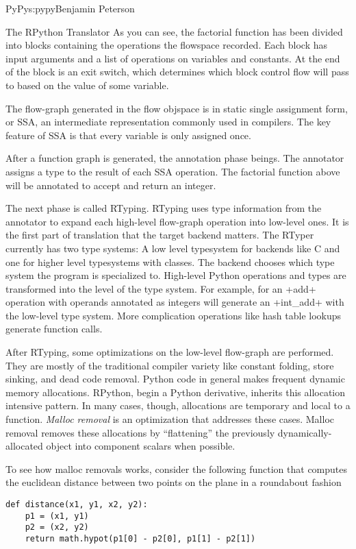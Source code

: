 \begin{aosachapter}{PyPy}{s:pypy}{Benjamin Peterson}
\begin{aosasect1}{The RPython Translator}
As you can see, the factorial function has been divided into blocks containing
the operations the flowspace recorded. Each block has input arguments and a list
of operations on variables and constants. At the end of the block is an exit
switch, which determines which block control flow will pass to based on the
value of some variable.

The flow-graph generated in the flow objspace is in static single assignment
form, or SSA, an intermediate representation commonly used in compilers. The key
feature of SSA is that every variable is only assigned once.

After a function graph is generated, the annotation phase beings. The annotator
assigns a type to the result of each SSA operation. The factorial function above
will be annotated to accept and return an integer.

The next phase is called RTyping. RTyping uses type information from the
annotator to expand each high-level flow-graph operation into low-level ones. It
is the first part of translation that the target backend matters. The RTyper
currently has two type systems: A low level typesystem for backends like C and
one for higher level typesystems with classes. The backend chooses which type
system the program is specialized to. High-level Python operations and types are
transformed into the level of the type system. For example, for an +add+
operation with operands annotated as integers will generate an +int\_add+ with
the low-level type system. More complication operations like hash table lookups
generate function calls.

After RTyping, some optimizations on the low-level flow-graph are
performed. They are mostly of the traditional compiler variety like constant
folding, store sinking, and dead code removal. Python code in general makes
frequent dynamic memory allocations. RPython, begin a Python derivative,
inherits this allocation intensive pattern. In many cases, though, allocations
are temporary and local to a function. \emph{Malloc removal} is an optimization
that addresses these cases. Malloc removal removes these allocations by
``flattening'' the previously dynamically-allocated object into component
scalars when possible.

To see how malloc removals works, consider the following function that computes
the euclidean distance between two points on the plane in a roundabout fashion
\begin{verbatim}
def distance(x1, y1, x2, y2):
    p1 = (x1, y1)
    p2 = (x2, y2)
    return math.hypot(p1[0] - p2[0], p1[1] - p2[1])
\end{verbatim}


\end{aosasect1}
\end{aosachapter}
